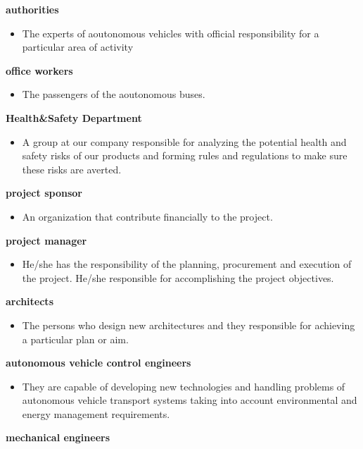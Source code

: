 \documentclass[a4paper]{article}
\begin{document}
\begin{list}{-}
	\item \textbf{authorities}
		\begin{itemize}	
			\item The experts of aoutonomous vehicles with official responsibility for a particular area of activity
		\end{itemize}
	\item \textbf{office workers}
		\begin{itemize}
			\item The passengers of the aoutonomous buses.
		\end{itemize}		
	\item \textbf{Health\&Safety Department}
		\begin{itemize}
			\item A group at our company responsible for analyzing the potential health and safety risks of our products and forming rules and regulations to make sure these risks are averted.
		\end{itemize}
	\item \textbf{project sponsor}
		\begin{itemize}
			\item An organization that contribute financially to the project.
		\end{itemize}	
	\item \textbf{project manager}
		\begin{itemize}
			\item He/she has the responsibility of the planning, procurement and execution of the project. He/she responsible for accomplishing the project objectives.
		\end{itemize}
	\item \textbf{architects}
		\begin{itemize}
			\item The persons who design new architectures and they responsible for achieving a particular plan or aim.
		\end{itemize}
	\item \textbf{autonomous vehicle control engineers}
		\begin{itemize}
			\item They are capable of developing new technologies and handling problems of autonomous vehicle transport systems taking into account environmental and energy management requirements.
		\end{itemize}
	\item \textbf{mechanical engineers}

\end{list}
\end{document}

